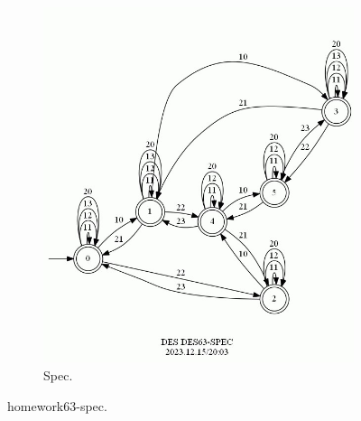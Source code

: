 \documentclass{article}
\begin{document}
\begin{figure}[h!]
\begin{subfigure}{0.6\linewidth}
    \includegraphics[width=\linewidth]{assets/DES63-SPEC.jpg}
    \caption{Spec.}
  \end{subfigure}
  \caption{homework63-spec.}
  \label{fig:des63-spec}
\end{figure}
\end{document}
